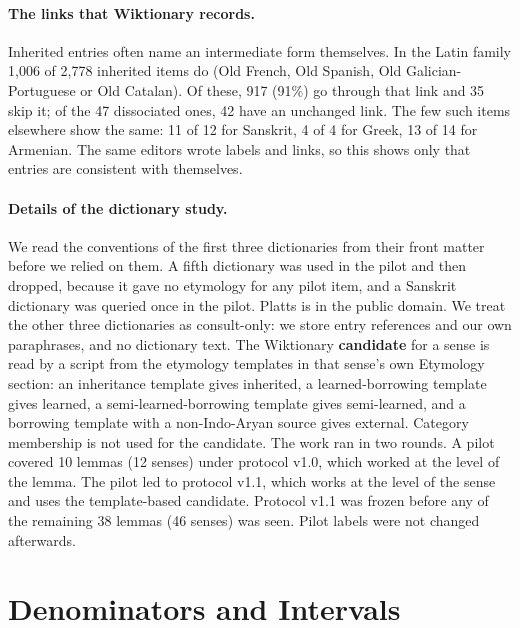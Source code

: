 \documentclass[11pt]{article}
\begin{document}
\paragraph{The links that Wiktionary records.} Inherited entries often name an intermediate form themselves. In the Latin family 1,006 of 2,778 inherited items do (Old French, Old Spanish, Old Galician-Portuguese or Old Catalan). Of these, 917 (91\%) go through that link and 35 skip it; of the 47 dissociated ones, 42 have an unchanged link. The few such items elsewhere show the same: 11 of 12 for Sanskrit, 4 of 4 for Greek, 13 of 14 for Armenian. The same editors wrote labels and links, so this shows only that entries are consistent with themselves.

\paragraph{Details of the dictionary study.} We read the conventions of the first three dictionaries from their front matter before we relied on them. A fifth dictionary was used in the pilot and then dropped, because it gave no etymology for any pilot item, and a Sanskrit dictionary was queried once in the pilot. Platts is in the public domain. We treat the other three dictionaries as consult-only: we store entry references and our own paraphrases, and no dictionary text. The Wiktionary \textbf{candidate} for a sense is read by a script from the etymology templates in that sense's own Etymology section: an inheritance template gives inherited, a learned-borrowing template gives learned, a semi-learned-borrowing template gives semi-learned, and a borrowing template with a non-Indo-Aryan source gives external. Category membership is not used for the candidate. The work ran in two rounds. A pilot covered 10 lemmas (12 senses) under protocol v1.0, which worked at the level of the lemma. The pilot led to protocol v1.1, which works at the level of the sense and uses the template-based candidate. Protocol v1.1 was frozen before any of the remaining 38 lemmas (46 senses) was seen. Pilot labels were not changed afterwards.

\section{Denominators and Intervals}
\label{app:denominators}
\end{document}
